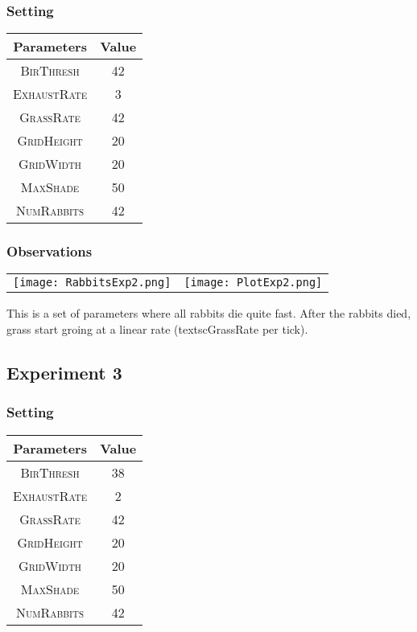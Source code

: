 \documentclass[11pt]{article}
\begin{document}
\subsubsection{Setting}
\begin{tabular}{ |c|c| }
 \hline
 Parameters & Value \\
 \hline\hline
 \textsc{BirThresh} & 42 \\
 \textsc{ExhaustRate} & 3 \\
 \textsc{GrassRate} & 42 \\
 \textsc{GridHeight} & 20 \\
 \textsc{GridWidth} & 20 \\
 \textsc{MaxShade} & 50 \\
 \textsc{NumRabbits} & 42 \\
 \hline
\end{tabular}
\subsubsection{Observations}
\begin{tabular}{|c c|}
\texttt{[image: RabbitsExp2.png]}&\texttt{[image: PlotExp2.png]}
\end{tabular}

\vspace{5mm}

This is a set of parameters where all rabbits die quite fast. After the rabbits died, grass start groing at a linear rate (textsc{GrassRate} per tick).

\subsection{Experiment 3}

\subsubsection{Setting}
\begin{tabular}{ |c|c| }
 \hline
 Parameters & Value \\
 \hline\hline
 \textsc{BirThresh} & 38 \\
 \textsc{ExhaustRate} & 2 \\
 \textsc{GrassRate} & 42 \\
 \textsc{GridHeight} & 20 \\
 \textsc{GridWidth} & 20 \\
 \textsc{MaxShade} & 50 \\
 \textsc{NumRabbits} & 42 \\
 \hline
\end{tabular}
\end{document}
